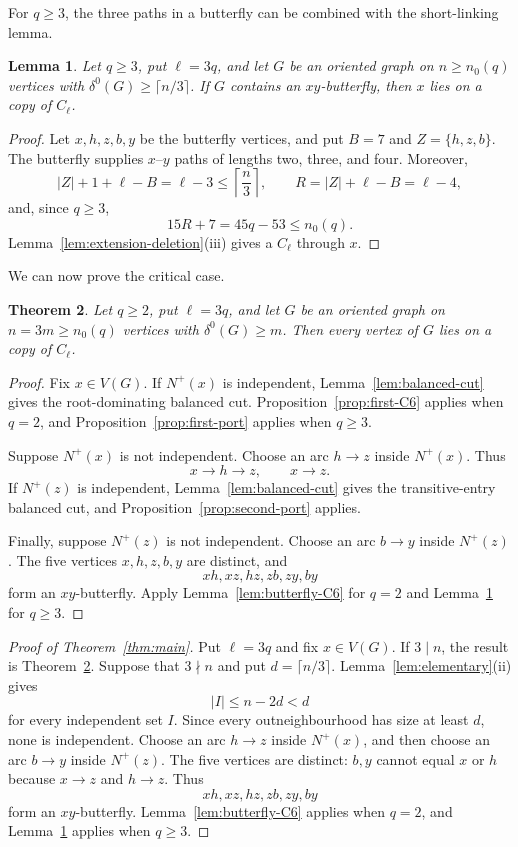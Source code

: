 \documentclass[11pt]{amsart}
\newtheorem{theorem}{Theorem}[section]
\newtheorem{lemma}[theorem]{Lemma}
\theoremstyle{definition}
\begin{document}
For $q\ge3$, the three paths in a butterfly can be combined with the
short-linking lemma.

\begin{lemma}\label{lem:butterfly-long}
Let $q\ge3$, put $\ell=3q$, and let $G$ be an oriented graph on
$n\ge n_0(q)$ vertices with
$\delta^0(G)\ge\lceil n/3\rceil$.  If $G$ contains an
$xy$-butterfly, then $x$ lies on a copy of $C_\ell$.
\end{lemma}

\begin{proof}
Let $x,h,z,b,y$ be the butterfly vertices, and put
$B=7$ and $Z=\{h,z,b\}$.  The butterfly supplies $x$--$y$ paths of
lengths two, three, and four.  Moreover,
\[
  |Z|+1+\ell-B=\ell-3\le\left\lceil\frac n3\right\rceil,
  \qquad R=|Z|+\ell-B=\ell-4,
\]
and, since $q\ge3$,
\[
  15R+7=45q-53\le n_0(q).
\]
Lemma~\ref{lem:extension-deletion}(iii) gives a $C_\ell$ through $x$.
\end{proof}

We can now prove the critical case.

\begin{theorem}\label{thm:critical}
Let $q\ge2$, put $\ell=3q$, and let $G$ be an oriented graph on
$n=3m\ge n_0(q)$ vertices with $\delta^0(G)\ge m$.  Then every vertex
of $G$ lies on a copy of $C_\ell$.
\end{theorem}

\begin{proof}
Fix $x\in V(G)$.  If $N^+(x)$ is independent,
Lemma~\ref{lem:balanced-cut} gives the root-dominating balanced cut.
Proposition~\ref{prop:first-C6} applies when $q=2$, and
Proposition~\ref{prop:first-port} applies when $q\ge3$.

Suppose $N^+(x)$ is not independent.  Choose an arc $h\to z$ inside $N^+(x)$.  Thus
\[
  x\to h\to z,\qquad x\to z.
\]
If $N^+(z)$ is independent, Lemma~\ref{lem:balanced-cut} gives the transitive-entry balanced cut, and Proposition~\ref{prop:second-port} applies.

Finally, suppose $N^+(z)$ is not independent.  Choose an arc $b\to y$ inside $N^+(z)$.  The five vertices $x,h,z,b,y$ are distinct, and
\[
  xh,xz,hz,zb,zy,by
\]
form an $xy$-butterfly.  Apply Lemma~\ref{lem:butterfly-C6} for $q=2$ and Lemma~\ref{lem:butterfly-long} for $q\ge3$.
\end{proof}

\begin{proof}[Proof of Theorem~\ref{thm:main}]
Put $\ell=3q$ and fix $x\in V(G)$.  If $3\mid n$, the result is
Theorem~\ref{thm:critical}.  Suppose that $3\nmid n$ and put
$d=\lceil n/3\rceil$.  Lemma~\ref{lem:elementary}(ii) gives
\[
  |I|\le n-2d<d
\]
for every independent set $I$.  Since every outneighbourhood has size
at least $d$, none is
independent.  Choose an arc $h\to z$ inside $N^+(x)$, and then choose
an arc $b\to y$ inside $N^+(z)$.  The five vertices are distinct:
$b,y$ cannot equal $x$ or $h$ because $x\to z$ and $h\to z$.
Thus
\[
  xh,xz,hz,zb,zy,by
\]
form an $xy$-butterfly.  Lemma~\ref{lem:butterfly-C6} applies when
$q=2$, and Lemma~\ref{lem:butterfly-long} applies when $q\ge3$.
\end{proof}
\end{document}
